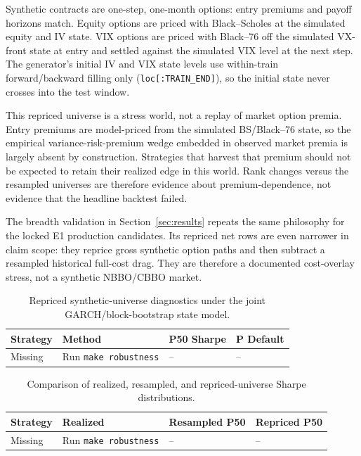 Synthetic contracts are one-step, one-month options: entry premiums and payoff horizons
match. Equity options are priced with Black--Scholes at the simulated equity and IV state.
VIX options are priced with Black--76 off the simulated VX-front state at entry and settled
against the simulated VIX level at the next step. The generator's initial IV and VIX state
levels use within-train forward/backward filling only (\texttt{loc[:TRAIN\_END]}), so the
initial state never crosses into the test window.

This repriced universe is a stress world, not a replay of market option premia. Entry
premiums are model-priced from the simulated BS/Black--76 state, so the empirical
variance-risk-premium wedge embedded in observed market premia is largely absent by
construction. Strategies that harvest that premium should not be expected to retain their
realized edge in this world. Rank changes versus the resampled universes are therefore
evidence about premium-dependence, not evidence that the headline backtest failed.

The breadth validation in Section~\ref{sec:results} repeats the same philosophy for the
locked E1 production candidates. Its repriced net rows are even narrower in claim scope:
they reprice gross synthetic option paths and then subtract a resampled historical
full-cost drag. They are therefore a documented cost-overlay stress, not a synthetic
NBBO/CBBO market.

\begin{table}[H]
\centering
\scriptsize
{}
  {\resizebox{\textwidth}{!}{}}
  {\begin{tabular}{llll}\toprule Strategy & Method & P50 Sharpe & P Default \\\midrule Missing & Run \texttt{make robustness} & -- & -- \\\bottomrule\end{tabular}}
\caption{Repriced synthetic-universe diagnostics under the joint GARCH/block-bootstrap
state model.}
\label{tab:mc_repriced_universes}
\end{table}

\clearpage

\begin{table}[H]
\centering
\scriptsize
{}
  {\resizebox{\textwidth}{!}{}}
  {\begin{tabular}{llll}\toprule Strategy & Realized & Resampled P50 & Repriced P50 \\\midrule Missing & Run \texttt{make robustness} & -- & -- \\\bottomrule\end{tabular}}
\caption{Comparison of realized, resampled, and repriced-universe Sharpe distributions.}
\label{tab:mc_universe_comparison}
\end{table}

